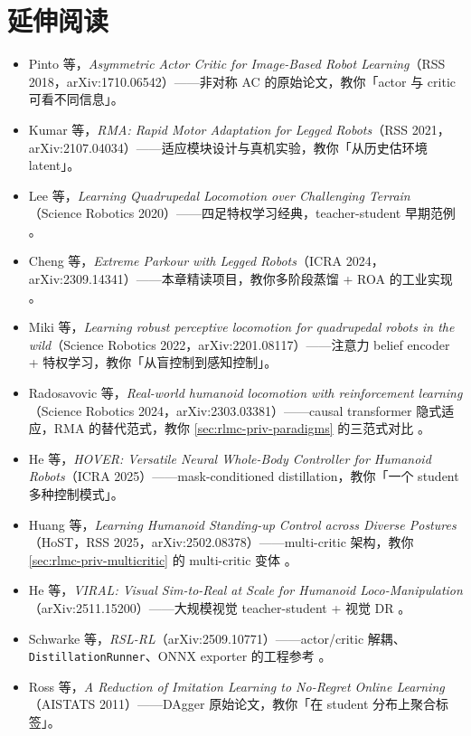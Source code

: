 \section*{延伸阅读}
\label{sec:rlmc-priv-further}

\begin{itemize}
  \item Pinto 等，\textit{Asymmetric Actor Critic for Image-Based Robot Learning}（RSS 2018，arXiv:1710.06542）——非对称 AC 的原始论文，教你「actor 与 critic 可看不同信息」\cite{pinto2018asymmetric}。
  \item Kumar 等，\textit{RMA: Rapid Motor Adaptation for Legged Robots}（RSS 2021，arXiv:2107.04034）——适应模块设计与真机实验，教你「从历史估环境 latent」\cite{kumar2021rma}。
  \item Lee 等，\textit{Learning Quadrupedal Locomotion over Challenging Terrain}（Science Robotics 2020）——四足特权学习经典，teacher-student 早期范例 \cite{lee2020quadruped}。
  \item Cheng 等，\textit{Extreme Parkour with Legged Robots}（ICRA 2024，arXiv:2309.14341）——本章精读项目，教你多阶段蒸馏 + ROA 的工业实现 \cite{cheng2024parkour}。
  \item Miki 等，\textit{Learning robust perceptive locomotion for quadrupedal robots in the wild}（Science Robotics 2022，arXiv:2201.08117）——注意力 belief encoder + 特权学习，教你「从盲控制到感知控制」\cite{miki2022perceptive}。
  \item Radosavovic 等，\textit{Real-world humanoid locomotion with reinforcement learning}（Science Robotics 2024，arXiv:2303.03381）——causal transformer 隐式适应，RMA 的替代范式，教你 \cref{sec:rlmc-priv-paradigms} 的三范式对比 \cite{radosavovic2024humanoid}。
  \item He 等，\textit{HOVER: Versatile Neural Whole-Body Controller for Humanoid Robots}（ICRA 2025）——mask-conditioned distillation，教你「一个 student 多种控制模式」\cite{he2025hover}。
  \item Huang 等，\textit{Learning Humanoid Standing-up Control across Diverse Postures}（HoST，RSS 2025，arXiv:2502.08378）——multi-critic 架构，教你 \cref{sec:rlmc-priv-multicritic} 的 multi-critic 变体 \cite{huang2025host}。
  \item He 等，\textit{VIRAL: Visual Sim-to-Real at Scale for Humanoid Loco-Manipulation}（arXiv:2511.15200）——大规模视觉 teacher-student + 视觉 DR \cite{he2025viral}。
  \item Schwarke 等，\textit{RSL-RL}（arXiv:2509.10771）——actor/critic 解耦、\texttt{DistillationRunner}、ONNX exporter 的工程参考 \cite{schwarke2025rslrl}。
  \item Ross 等，\textit{A Reduction of Imitation Learning to No-Regret Online Learning}（AISTATS 2011）——DAgger 原始论文，教你「在 student 分布上聚合标签」\cite{ross2011dagger}。
\end{itemize}

